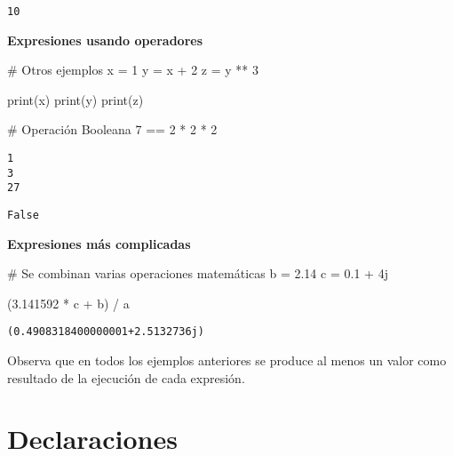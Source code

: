 \documentclass[
  letterpaper,
  DIV=11,
  numbers=noendperiod]{scrreprt}
\newenvironment{Shaded}{\begin{snugshade}}{\end{snugshade}}
\newcommand{\BuiltInTok}[1]{\textcolor[rgb]{0.00,0.23,0.31}{#1}}
\newcommand{\CommentTok}[1]{\textcolor[rgb]{0.37,0.37,0.37}{#1}}
\newcommand{\DecValTok}[1]{\textcolor[rgb]{0.68,0.00,0.00}{#1}}
\newcommand{\FloatTok}[1]{\textcolor[rgb]{0.68,0.00,0.00}{#1}}
\newcommand{\NormalTok}[1]{\textcolor[rgb]{0.00,0.23,0.31}{#1}}
\newcommand{\OperatorTok}[1]{\textcolor[rgb]{0.37,0.37,0.37}{#1}}
\newcommand{\OtherTok}[1]{\textcolor[rgb]{0.00,0.23,0.31}{#1}}
\begin{document}
\begin{verbatim}
10
\end{verbatim}

\textbf{Expresiones usando operadores}

\begin{Shaded}
\begin{Highlighting}[]
\CommentTok{\# Otros ejemplos}
\NormalTok{x }\OperatorTok{=} \DecValTok{1}
\NormalTok{y }\OperatorTok{=}\NormalTok{ x }\OperatorTok{+} \DecValTok{2}
\NormalTok{z }\OperatorTok{=}\NormalTok{ y }\OperatorTok{**} \DecValTok{3}

\BuiltInTok{print}\NormalTok{(x)}
\BuiltInTok{print}\NormalTok{(y)}
\BuiltInTok{print}\NormalTok{(z)}

\CommentTok{\# Operación Booleana}
\DecValTok{7} \OperatorTok{==} \DecValTok{2} \OperatorTok{*} \DecValTok{2} \OperatorTok{*} \DecValTok{2}
\end{Highlighting}
\end{Shaded}

\begin{verbatim}
1
3
27
\end{verbatim}

\begin{verbatim}
False
\end{verbatim}

\textbf{Expresiones más complicadas}

\begin{Shaded}
\begin{Highlighting}[]
\CommentTok{\# Se combinan varias operaciones matemáticas}
\NormalTok{b }\OperatorTok{=} \FloatTok{2.14}
\NormalTok{c }\OperatorTok{=} \FloatTok{0.1} \OperatorTok{+} \OtherTok{4j}

\NormalTok{(}\FloatTok{3.141592} \OperatorTok{*}\NormalTok{ c }\OperatorTok{+}\NormalTok{ b) }\OperatorTok{/}\NormalTok{ a}
\end{Highlighting}
\end{Shaded}

\begin{verbatim}
(0.4908318400000001+2.5132736j)
\end{verbatim}

Observa que en todos los ejemplos anteriores se produce al menos un
valor como resultado de la ejecución de cada expresión.

\section{Declaraciones}\label{declaraciones}
\end{document}
